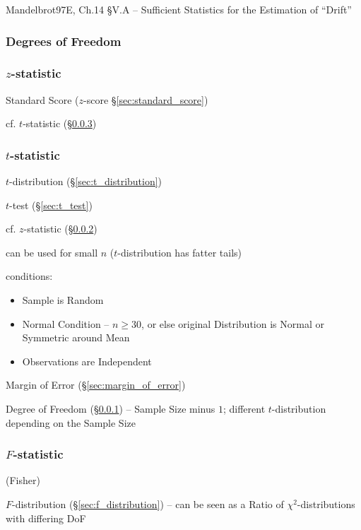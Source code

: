 Mandelbrot97E, Ch.14 \S V.A -- Sufficient Statistics for the Estimation of
``Drift''



\subsubsection{Degrees of Freedom}\label{sec:statistical_freedom}

\subsubsection{$z$-statistic}\label{sec:z_statistic}

Standard Score ($z$-score \S\ref{sec:standard_score})

cf. $t$-statistic (\S\ref{sec:t_statistic})



\subsubsection{$t$-statistic}\label{sec:t_statistic}

$t$-distribution (\S\ref{sec:t_distribution})

$t$-test (\S\ref{sec:t_test})

cf. $z$-statistic (\S\ref{sec:z_statistic})

can be used for small $n$ ($t$-distribution has fatter tails)

conditions:
\begin{itemize}
  \item Sample is Random
  \item Normal Condition -- $n \geq 30$, or else original Distribution is Normal
    or Symmetric around Mean
  \item Observations are Independent
\end{itemize}

Margin of Error (\S\ref{sec:margin_of_error})

Degree of Freedom (\S\ref{sec:statistical_freedom}) -- Sample Size minus $1$;
different $t$-distribution depending on the Sample Size



\subsubsection{$F$-statistic}\label{sec:f_statistic}

(Fisher)

$F$-distribution (\S\ref{sec:f_distribution}) -- can be seen as a Ratio of
$\chi^2$-distributions with differing DoF

